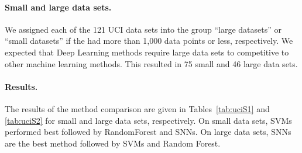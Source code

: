 \documentclass{article}
\begin{document}
\paragraph{Small and large data sets.} 
We assigned each of the 121 UCI data sets into the group ``large datasets'' or 
``small datasets'' if the had more than 1,000 data points or less, respectively. 
We expected that Deep Learning methods require large data sets to competitive to other machine learning methods.
This resulted in 75 small and 46 large data sets. 

\paragraph{Results.}
The results of the method comparison are given in Tables~\ref{tab:uciS1} and \ref{tab:uciS2} for 
small and large data sets, respectively. On small data sets, SVMs performed best followed 
by RandomForest and SNNs. On large data sets, SNNs are the best method followed by SVMs and 
Random Forest.
\end{document}

